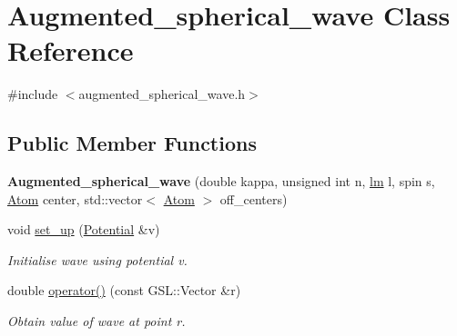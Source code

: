 \hypertarget{classAugmented__spherical__wave}{}\section{Augmented\+\_\+spherical\+\_\+wave Class Reference}
\label{classAugmented__spherical__wave}


{\ttfamily \#include $<$augmented\+\_\+spherical\+\_\+wave.\+h$>$}

\subsection*{Public Member Functions}
\begin{DoxyCompactItemize}
\item 
\mbox{\label{classAugmented__spherical__wave_a33fca69626caef4bb002fa5251d6bb95}} 
{\bfseries Augmented\+\_\+spherical\+\_\+wave} (double kappa, unsigned int n, \hyperlink{structlm}{lm} l, spin s, \hyperlink{classAtom}{Atom} center, std\+::vector$<$ \hyperlink{classAtom}{Atom} $>$ off\+\_\+centers)
\item 
\mbox{\label{classAugmented__spherical__wave_a765064afaa2abf01c4333bcc687fbf0b}} 
void \hyperlink{classAugmented__spherical__wave_a765064afaa2abf01c4333bcc687fbf0b}{set\+\_\+up} (\hyperlink{classPotential}{Potential} \&v)
\begin{DoxyCompactList}\small\item\em Initialise wave using potential v. \end{DoxyCompactList}\item 
\mbox{\label{classAugmented__spherical__wave_ab39ad0916daf3a7755597a9ad17c6fd2}} 
double \hyperlink{classAugmented__spherical__wave_ab39ad0916daf3a7755597a9ad17c6fd2}{operator()} (const G\+S\+L\+::\+Vector \&r)
\begin{DoxyCompactList}\small\item\em Obtain value of wave at point r. \end{DoxyCompactList}\end{DoxyCompactItemize}
